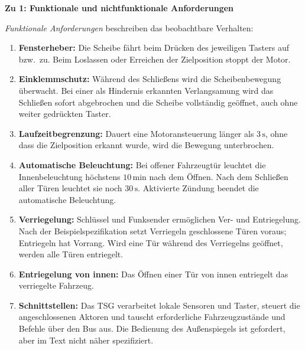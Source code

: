 \ifloesung{\clearpage}
\begin{loesung}
\textbf{Zu 1: Funktionale und nichtfunktionale Anforderungen}

\emph{Funktionale Anforderungen} beschreiben das beobachtbare Verhalten:
\begin{enumerate}[label=F\arabic*.]
  \item \textbf{Fensterheber:} Die Scheibe fährt beim Drücken des jeweiligen Tasters auf bzw.\ zu. Beim Loslassen oder Erreichen der Zielposition stoppt der Motor.
  \item \textbf{Einklemmschutz:} Während des Schließens wird die Scheibenbewegung überwacht. Bei einer als Hindernis erkannten Verlangsamung wird das Schließen sofort abgebrochen und die Scheibe vollständig geöffnet, auch ohne weiter gedrückten Taster.
  \item \textbf{Laufzeitbegrenzung:} Dauert eine Motoransteuerung länger als $3\,\mathrm{s}$, ohne dass die Zielposition erkannt wurde, wird die Bewegung unterbrochen.
  \item \textbf{Automatische Beleuchtung:} Bei offener Fahrzeugtür leuchtet die Innenbeleuchtung höchstens $10\,\mathrm{min}$ nach dem Öffnen. Nach dem Schließen aller Türen leuchtet sie noch $30\,\mathrm{s}$. Aktivierte Zündung beendet die automatische Beleuchtung.
  \item \textbf{Verriegelung:} Schlüssel und Funksender ermöglichen Ver- und Entriegelung. Nach der Beispielspezifikation setzt Verriegeln geschlossene Türen voraus; Entriegeln hat Vorrang. Wird eine Tür während des Verriegelns geöffnet, werden alle Türen entriegelt.
  \item \textbf{Entriegelung von innen:} Das Öffnen einer Tür von innen entriegelt das verriegelte Fahrzeug.
  \item \textbf{Schnittstellen:} Das TSG verarbeitet lokale Sensoren und Taster, steuert die angeschlossenen Aktoren und tauscht erforderliche Fahrzeugzustände und Befehle über den Bus aus. Die Bedienung des Außenspiegels ist gefordert, aber im Text nicht näher spezifiziert.
\end{enumerate}


\end{loesung}
